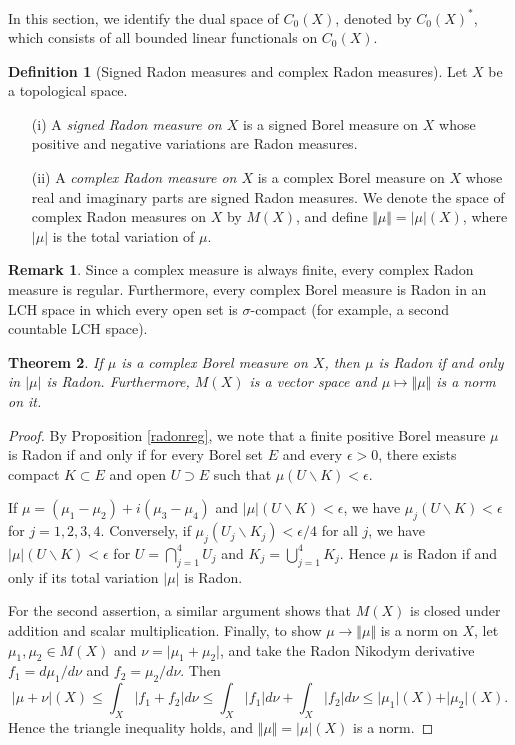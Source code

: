 \documentclass{article}
\numberwithin{equation}{section}
\theoremstyle{plain}
\newtheorem{theorem}{Theorem}[section]
\theoremstyle{definition}
\newtheorem{definition}[theorem]{Definition}
\newtheorem*{remark}{Remark}
\begin{document}
In this section, we identify the dual space of $C_0(X)$, denoted by $C_0(X)^*$, which consists of all bounded linear functionals on $C_0(X)$. 

\begin{definition}[Signed Radon measures and complex Radon measures] Let $X$ be a topological space.
	\begin{itemize}
		\item[(i)] A \textit{signed Radon measure on $X$} is a signed Borel measure on $X$ whose positive and negative variations are Radon measures.
		\item[(ii)] A \textit{complex Radon measure on $X$} is a complex Borel measure on $X$ whose real and imaginary parts are signed Radon measures. We denote the space of complex Radon measures on $X$ by $M(X)$, and define $\Vert\mu\Vert=\vert\mu\vert(X)$, where $\vert\mu\vert$ is the total variation of $\mu$.
	\end{itemize}
\end{definition}
\begin{remark}
Since a complex measure is always finite, every complex Radon measure is regular. Furthermore, every complex Borel measure is Radon in an LCH space in which every open set is $\sigma$-compact (for example, a second countable LCH space).
\end{remark} 

\begin{theorem}
	If $\mu$ is a complex Borel measure on $X$, then $\mu$ is Radon if and only in $\vert\mu\vert$ is Radon. Furthermore, $M(X)$ is a vector space and $\mu\mapsto\Vert\mu\Vert$ is a norm on it.
\end{theorem}
\begin{proof}
	By Proposition \ref{radonreg}, we note that a finite positive Borel measure $\mu$ is Radon if and only if for every Borel set $E$ and every $\epsilon>0$, there exists compact $K\subset E$ and open $U\supset E$ such that $\mu(U\backslash K)<\epsilon$. 
	
	If $\mu=(\mu_1-\mu_2)+i(\mu_3-\mu_4)$ and $\vert\mu\vert(U\backslash K)<\epsilon$, we have $\mu_j(U\backslash K)<\epsilon$ for $j=1,2,3,4$. Conversely, if $\mu_j(U_j\backslash K_j)<\epsilon/4$ for all $j$, we have $\vert\mu\vert(U\backslash K)<\epsilon$ for $U=\bigcap_{j=1}^4 U_j$ and $K_j=\bigcup_{j=1}^4 K_j$. Hence $\mu$ is Radon if and only if its total variation $\vert\mu\vert$ is Radon. 
	
	For the second assertion, a similar argument shows that $M(X)$ is closed under addition and scalar multiplication. Finally, to show $\mu\to\Vert\mu\Vert$ is a norm on $X$, let $\mu_1,\mu_2\in M(X)$ and $\nu=\vert\mu_1+\mu_2\vert$, and take the Radon Nikodym derivative $f_1=d\mu_1/d\nu$ and $f_2=\mu_2/d\nu$. Then $$\vert\mu+\nu\vert(X)\leq \int_X\vert f_1+f_2\vert d\nu\leq \int_X\vert f_1\vert d\nu+ \int_X\vert f_2\vert d\nu\leq\vert\mu_1\vert(X)+\vert\mu_2\vert(X).$$
	Hence the triangle inequality holds, and $\Vert\mu\Vert=\vert\mu\vert(X)$ is a norm.
\end{proof}
\end{document}

